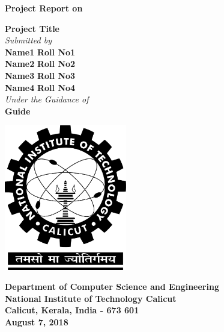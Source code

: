 \documentclass[twocolumn]{article}
\date{}
\begin{document}
\begin{titlepage}
\begin{center}
\vspace{1cm}
\normalsize
\textbf{Project Report on}\\
\vspace{0.5cm}

\Large
\textbf{Project Title}\\
\vspace{0.5cm}
\emph{Submitted by}\\        
\vspace{0.5cm}
\large
\textbf{Name1} \hspace{0.75cm}    
\textbf{Roll No1}\\
\textbf{Name2} \hspace{0.75cm}    
\textbf{Roll No2}\\
\textbf{Name3} \hspace{0.75cm}    
\textbf{Roll No3}\\
\textbf{Name4} \hspace{0.75cm}    
\textbf{Roll No4}\\
\vspace{0.2cm}
\emph{Under the Guidance of}\\ 
\large
\vspace{0.5cm}
\textbf{Guide} 

\vspace{.5cm}
\begin{center}
 \includegraphics[width=0.4\textwidth]{nitc-logo.png}
\end{center}
\vspace{0.8cm}
\textbf{Department of Computer Science and Engineering}\\
\textbf{National Institute of Technology Calicut}\\
\textbf{Calicut, Kerala, India - 673 601}\\
\vspace{0.8cm}
\textbf{August 7, 2018} %
\end{center}
\end{titlepage}
\end{document}
